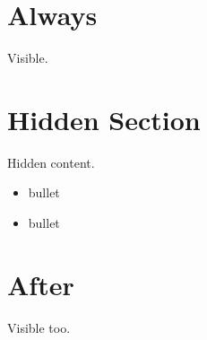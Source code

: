 \hypertarget{always}{%
\section{Always}\label{always}}

Visible.

\hypertarget{hidden-section}{%
\section{Hidden Section}\label{hidden-section}}

Hidden content.

\begin{itemize}
\tightlist
\item
  bullet
\item
  bullet
\end{itemize}

\hypertarget{after}{%
\section{After}\label{after}}

Visible too.
